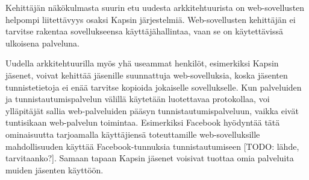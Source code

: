 Kehittäjän näkökulmasta suurin etu uudesta arkkitehtuurista on web-sovellusten helpompi liitettävyys osaksi Kapsin järjestelmiä. Web-sovellusten kehittäjän ei tarvitse rakentaa sovellukseensa käyttäjähallintaa, vaan se on käytettävissä ulkoisena palveluna.

Uudella arkkitehtuurilla myös yhä useammat henkilöt, esimerkiksi Kapsin jäsenet, voivat kehittää jäsenille suunnattuja web-sovelluksia, koska jäsenten tunnistetietoja ei enää tarvitse kopioida jokaiselle sovellukselle. Kun palveluiden ja tunnistautumispalvelun välillä käytetään luotettavaa protokollaa, voi ylläpitäjät sallia web-palveluiden pääsyn tunnistautumispalveluun, vaikka eivät tuntisikaan web-palvelun toimintaa. Esimerkiksi Facebook hyödyntää tätä ominaisuutta tarjoamalla käyttäjiensä toteuttamille web-sovelluksille mahdollisuuden käyttää Facebook-tunnuksia tunnistautumiseen [TODO: lähde, tarvitaanko?]. Samaan tapaan Kapsin jäsenet voisivat tuottaa omia palveluita muiden jäsenten käyttöön.